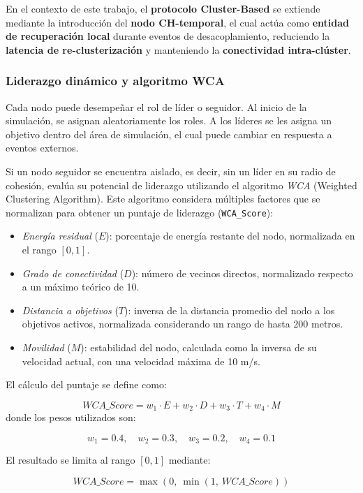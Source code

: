 \documentclass{article}
\begin{document}
En el contexto de este trabajo, el \textbf{protocolo Cluster-Based} se extiende mediante la introducción del \textbf{nodo CH-temporal}, el cual actúa como \textbf{entidad de recuperación local} durante eventos de desacoplamiento, reduciendo la \textbf{latencia de re-clusterización} y manteniendo la \textbf{conectividad intra-clúster}.

\subsubsection{Liderazgo dinámico y algoritmo WCA}

Cada nodo puede desempeñar el rol de líder o seguidor. Al inicio de la simulación, se asignan aleatoriamente los roles. A los líderes se les asigna un objetivo dentro del área de simulación, el cual puede cambiar en respuesta a eventos externos.

Si un nodo seguidor se encuentra aislado, es decir, sin un líder en su radio de cohesión, evalúa su potencial de liderazgo utilizando el algoritmo \textit{WCA} (Weighted Clustering Algorithm). Este algoritmo considera múltiples factores que se normalizan para obtener un puntaje de liderazgo (\texttt{WCA\_Score}):

\begin{itemize}
    \item \textit{Energía residual} (\(E\)): porcentaje de energía restante del nodo, normalizada en el rango \([0,1]\).
    \item \textit{Grado de conectividad} (\(D\)): número de vecinos directos, normalizado respecto a un máximo teórico de 10.
    \item \textit{Distancia a objetivos} (\(T\)): inversa de la distancia promedio del nodo a los objetivos activos, normalizada considerando un rango de hasta 200 metros.
    \item \textit{Movilidad} (\(M\)): estabilidad del nodo, calculada como la inversa de su velocidad actual, con una velocidad máxima de 10 m/s.
\end{itemize}

El cálculo del puntaje se define como:

\[
{WCA\_Score} = w_1 \cdot E + w_2 \cdot D + w_3 \cdot T + w_4 \cdot M
\]
donde los pesos utilizados son:

\[
w_1 = 0.4, \quad w_2 = 0.3, \quad w_3 = 0.2, \quad w_4 = 0.1
\]

El resultado se limita al rango \([0, 1]\) mediante:

\[
{WCA\_Score} = \max\left(0,\ \min\left(1,\ {WCA\_Score}\right)\right)
\]
\end{document}
